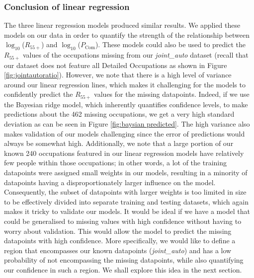\documentclass[11pt]{article}
\begin{document}
\subsubsection*{Conclusion of linear regression}
The three linear regression models produced similar results. We applied these models on our data in order to quantify the strength of the relationship between $\log_{10}$($R_{55+}$) and $\log_{10}$($P_{\text{Com}}$). These models could also be used to predict the $R_{55+}$ values of the occupations missing from our \emph{joint\_auto} dataset (recall that our dataset does not feature all Detailed Occupations as shown in Figure \ref{fig:jointautoratio}). However, we note that there is a high level of variance around our linear regression lines, which makes it challenging for the models to confidently predict the $R_{55+}$ values for the missing datapoints. Indeed, if we use the Bayesian ridge model, which inherently quantifies confidence levels, to make predictions about the 462 missing occupations, we get a very high standard deviation as can be seen in Figure \ref{fig:baysian predicted}. The high variance also makes validation of our models challenging since the error of predictions would always be somewhat high. Additionally, we note that a large portion of our known 240 occupations featured in our linear regression models have relatively few people within those occupations; in other words, a lot of the training datapoints were assigned small weights in our models, resulting in a minority of datapoints having a disproportionately larger influence on the model. Consequently, the subset of datapoints with larger weights is too limited in size to be effectively divided into separate training and testing datasets, which again makes it tricky to validate our models. It would be ideal if we have a model that could be generalised to missing values with high confidence without having to worry about validation. This would allow the model to predict the missing datapoints with high confidence. More specifically, we would like to define a region that encompasses our known datapoints (\emph{joint\_auto}) and has a low probability of not encompassing the missing datapoints, while also quantifying our confidence in such a region. We shall explore this idea in the next section.
\end{document}
